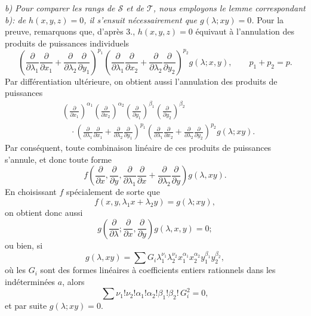 \emph{b) Pour comparer les rangs de $\mathcal S$ et de $\mathcal T$, nous employons le lemme correspondant b): de $h(x,y,z)=0$, il s'ensuit nécessairement que $g(\lambda;xy)=0$.} Pour la preuve, remarquons que, d'après 3., $h(x,y,z)=0$ équivaut à l'annulation des produits de puissances individuels
\[
 \left(\frac{\partial}{\partial\lambda_1}\frac{\partial}{\partial x_1}
 +\frac{\partial}{\partial\lambda_2}\frac{\partial}{\partial y_1}\right)^{p_1}
 \left(\frac{\partial}{\partial\lambda_1}\frac{\partial}{\partial x_2}
 +\frac{\partial}{\partial\lambda_2}\frac{\partial}{\partial y_2}\right)^{p_2}g(\lambda;x,y),
 \qquad p_1+p_2=p.
\]
Par différentiation ultérieure, on obtient aussi l'annulation des produits de puissances
\[
\begin{aligned}
&\left(\frac{\partial}{\partial x_1}\right)^{\alpha_1}
 \left(\frac{\partial}{\partial x_2}\right)^{\alpha_2}
 \left(\frac{\partial}{\partial y_1}\right)^{\beta_1}
 \left(\frac{\partial}{\partial y_2}\right)^{\beta_2} \\
&\quad\cdot
 \left(\frac{\partial}{\partial\lambda_1}\frac{\partial}{\partial x_1}
 +\frac{\partial}{\partial\lambda_2}\frac{\partial}{\partial y_1}\right)^{p_1}
 \left(\frac{\partial}{\partial\lambda_1}\frac{\partial}{\partial x_2}
 +\frac{\partial}{\partial\lambda_2}\frac{\partial}{\partial y_2}\right)^{p_2}
 g(\lambda;xy).
\end{aligned}
\]
Par conséquent, toute combinaison linéaire de ces produits de puissances s'annule, et donc toute forme
\[
  f\left(\frac{\partial}{\partial x},\frac{\partial}{\partial y},
  \frac{\partial}{\partial\lambda_1}\frac{\partial}{\partial x}
  +\frac{\partial}{\partial\lambda_2}\frac{\partial}{\partial y}\right)g(\lambda,xy).
\]
En choisissant $f$ spécialement de sorte que
\[
  f(x,y,\lambda_1x+\lambda_2y)=g(\lambda;xy),
\]
on obtient donc aussi
\[
  g\left(\frac{\partial}{\partial\lambda};
    \frac{\partial}{\partial x},
    \frac{\partial}{\partial y}\right)g(\lambda,x,y)=0;
\]
ou bien, si
\[
  g(\lambda,xy)=\sum G_i\lambda_1^{\nu_1}\lambda_2^{\nu_2}
  x_1^{\alpha_1}x_2^{\alpha_2}y_1^{\beta_1}y_2^{\beta_2},
\]
où les $G_i$ sont des formes linéaires à coefficients entiers rationnels dans les indéterminées $a$, alors
\[
  \sum \nu_1!\nu_2!\alpha_1!\alpha_2!\beta_1!\beta_2!\,G_i^2=0,
\]
et par suite $g(\lambda;xy)=0$.

